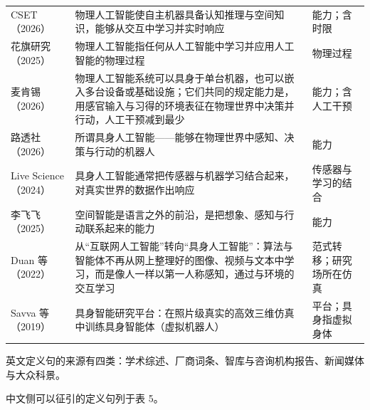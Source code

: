 \documentclass[10pt,fontset=fandol]{ctexart}
\begin{document}
\begin{table}[htbp]
\begin{tabularx}{\textwidth}{>{\raggedright\arraybackslash}p{3.3cm}Y>{\raggedright\arraybackslash}p{2.6cm}}
CSET（2026）\cite{cset2026} & 物理人工智能使自主机器具备认知推理与空间知识，能够从交互中学习并实时响应 & 能力；含时限 \\
花旗研究（2025）\cite{citi2025} & 物理人工智能指任何从人工智能中学习并应用人工智能的物理过程 & 物理过程 \\
麦肯锡（2026）\cite{mckinsey2026} & 物理人工智能系统可以具身于单台机器，也可以嵌入多台设备或基础设施；它们共同的规定能力是，用感官输入与习得的环境表征在物理世界中决策并行动，人工干预减到最少 & 能力；含人工干预 \\
路透社（2026）\cite{reuters2026} & 所谓具身人工智能——能够在物理世界中感知、决策与行动的机器人 & 能力 \\
Live Science（2024）\cite{livescience2024} & 具身人工智能通常把传感器与机器学习结合起来，对真实世界的数据作出响应 & 传感器与学习的结合 \\
李飞飞（2025）\cite{feili2025} & 空间智能是语言之外的前沿，是把想象、感知与行动联系起来的能力 & 能力 \\
Duan 等（2022）\cite{duan2022} & 从“互联网人工智能”转向“具身人工智能”：算法与智能体不再从网上整理好的图像、视频与文本中学习，而是像人一样以第一人称感知，通过与环境的交互学习 & 范式转移；研究场所在仿真 \\
Savva 等（2019）\cite{savva2019} & 具身智能研究平台：在照片级真实的高效三维仿真中训练具身智能体（虚拟机器人） & 平台；具身指虚拟身体 \\
\bottomrule
\end{tabularx}
\end{table}
英文定义句的来源有四类：学术综述、厂商词条、智库与咨询机构报告、新闻媒体与大众科景。

中文侧可以征引的定义句列于表 5。
\end{document}
